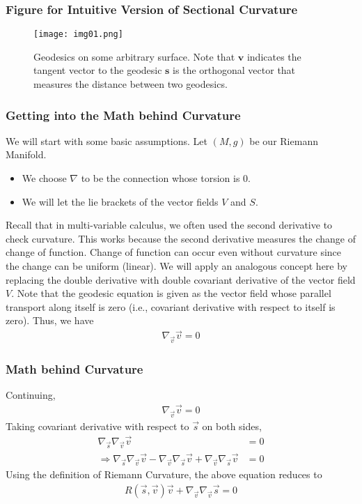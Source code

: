 \begin{frame}
\frametitle{Figure for Intuitive Version of Sectional Curvature}
\begin{figure}[!htb]
	\centering
   \begin{minipage}{0.8\textwidth}
     \centering
     \texttt{[image: img01.png]}
     \caption{{Geodesics on some arbitrary surface. Note that $\mathbf{v}$ indicates the tangent vector to the geodesic $\mathbf{s}$ is the orthogonal vector that measures the distance between two geodesics.}}
     \label{fig:01}
   \end{minipage}
\end{figure}
\end{frame}
%
%
\begin{frame}
\frametitle{Getting into the Math behind Curvature}
We will start with some basic assumptions. Let $(M,g)$ be our Riemann Manifold.
\begin{itemize}
\item We choose $\nabla$ to be the connection whose torsion is $0$.
\item We will let the lie brackets of the vector fields $V$ and $S$.
\end{itemize}
\pause
Recall that in multi-variable calculus, we often used the second derivative to check curvature. This works because the second derivative measures the change of change of function. Change of function can occur even without curvature since the change can be uniform (linear). We will apply an analogous concept here by replacing the double derivative with double covariant derivative of the vector field $V$.
\pause
Note that the geodesic equation is given as the vector field whose parallel transport along itself is zero (i.e., covariant derivative with respect to itself is zero).
Thus, we have
\begin{align}
\nabla_{\vec{v}} \vec{v}=0
\end{align}
\end{frame}

\begin{frame}
\frametitle{Math behind Curvature}
Continuing,
\begin{align}
\nabla_{\vec{v}} \vec{v}=0
\end{align}
Taking covariant derivative with respect to $\vec{s}$ on both sides,
\begin{align}
\nabla_{\vec{s}}\nabla_{\vec{v}} \vec{v}&=0\\
\Rightarrow \nabla_{\vec{s}}\nabla_{\vec{v}} \vec{v}-\nabla_{\vec{v}}\nabla_{\vec{s}} \vec{v}+\nabla_{\vec{v}}\nabla_{\vec{s}} \vec{v}&=0
\end{align}
Using the definition of Riemann Curvature, the above equation reduces to
\begin{align}
\label{main_eq}
R(\vec{s},\vec{v})\vec{v}+\nabla_{\vec{v}}\nabla_{\vec{v}} \vec{s}=0
\end{align}
\end{frame}


